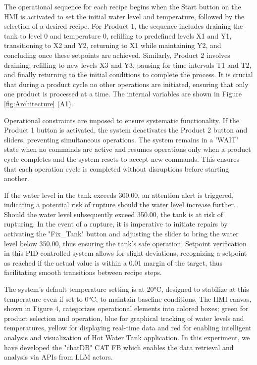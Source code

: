 \documentclass[conference]{IEEEtran}
\begin{document}
The operational sequence for each recipe begins when the Start button on the HMI is activated to set the initial water level and temperature, followed by the selection of a desired recipe. For Product 1, the sequence includes draining the tank to level 0 and temperature 0, refilling to predefined levels X1 and Y1, transitioning to X2 and Y2, returning to X1 while maintaining Y2, and concluding once these setpoints are achieved. Similarly, Product 2 involves draining, refilling to new levels X3 and Y3, pausing for time intervals T1 and T2, and finally returning to the initial conditions to complete the process. It is crucial that during a product cycle no other operations are initiated, ensuring that only one product is processed at a time. The internal variables are shown in Figure \ref{fig:Architecture} (A1).

Operational constraints are imposed to ensure systematic functionality. If the Product 1 button is activated, the system deactivates the Product 2 button and sliders, preventing simultaneous operations. The system remains in a 'WAIT' state when no commands are active and resumes operations only when a product cycle completes and the system resets to accept new commands. This ensures that each operation cycle is completed without disruptions before starting another.

If the water level in the tank exceeds 300.00, an attention alert is triggered, indicating a potential risk of rupture should the water level increase further. Should the water level subsequently exceed 350.00, the tank is at risk of rupturing. In the event of a rupture, it is imperative to initiate repairs by activating the "Fix\_Tank" button and adjusting the slider to bring the water level below 350.00, thus ensuring the tank's safe operation. Setpoint verification in this PID-controlled system allows for slight deviations, recognizing a setpoint as reached if the actual value is within a 0.01 margin of the target, thus facilitating smooth transitions between recipe steps. 

The system's default temperature setting is at 20°C, designed to stabilize at this temperature even if set to 0°C, to maintain baseline conditions. The HMI canvas, shown in Figure 4, categorizes operational elements into colored boxes; green for product selection and operation, blue for graphical tracking of water levels and temperatures,  yellow for displaying real-time data and red for enabling intelligent analysis and visualization of Hot Water Tank application. In this experiment, we have developed the "chatDB" CAT FB which enables the data retrieval and analysis via APIs from LLM actors.
\end{document}
